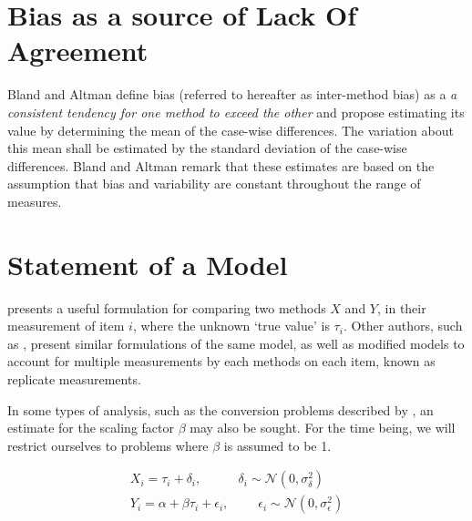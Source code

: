 \documentclass[12pt, a4paper]{report}
\theoremstyle{plain}
\theoremstyle{definition}
\theoremstyle{remark}
\begin{document}
	


	
	
	


	

	\section{Bias as a source of Lack Of Agreement}
	Bland and Altman define bias (referred to hereafter as inter-method bias) as a \emph{a consistent tendency for one method to exceed the other} and propose estimating its value by determining the mean of the case-wise differences. 
	The variation about this mean shall be estimated by the  standard deviation of the case-wise differences. Bland and Altman remark that these estimates are based on the assumption that bias and variability are constant throughout the
	range of measures.
	
	
	
	
	
	\section{Statement of a Model}
	\citet{BXC2010} presents a useful formulation for comparing two methods $X$ and $Y$, in their measurement of item $i$, where the unknown `true value' is $\tau_i$. Other authors, such as \citet{kinsella}, present similar formulations of the same model, as well as modified models to account for multiple measurements by each methods on each item, known as replicate measurements.
	
%	
	In some types of analysis, such as the conversion problems described by \citet{lewis}, an estimate for 
	the scaling factor $\beta$ may also be sought. For the time being, we will restrict ourselves to problems where $\beta$ is assumed to be 1. 
	
	\begin{eqnarray}
		X_i = \tau_i + \delta_i , \phantom{spacin} \delta_i \sim \mathcal{N}(0,\sigma^2_\delta)\\
		Y_i = \alpha + \beta \tau_i + \epsilon_i, \phantom{spaci}  \epsilon_i \sim \mathcal{N}(0,\sigma^2_\epsilon)
	\end{eqnarray}
	
\end{document}
